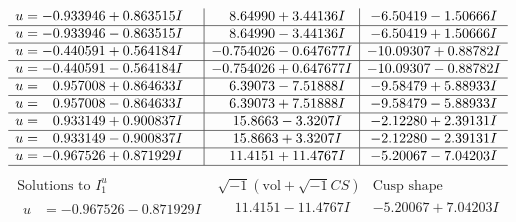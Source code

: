 \documentclass[1p]{elsarticle_modified}
\theoremstyle{definition}
\newcommand{\I}{\sqrt{-1}}
\begin{document}
$$\begin{array}{c|c|c}
\begin{aligned}
u &= -0.933946 + 0.863515 I\end{aligned}
 & \phantom{-}8.64990 + 3.44136 I & -6.50419 - 1.50666 I \\ \hline\begin{aligned}
u &= -0.933946 - 0.863515 I\end{aligned}
 & \phantom{-}8.64990 - 3.44136 I & -6.50419 + 1.50666 I \\ \hline\begin{aligned}
u &= -0.440591 + 0.564184 I\end{aligned}
 & -0.754026 - 0.647677 I & -10.09307 + 0.88782 I \\ \hline\begin{aligned}
u &= -0.440591 - 0.564184 I\end{aligned}
 & -0.754026 + 0.647677 I & -10.09307 - 0.88782 I \\ \hline\begin{aligned}
u &= \phantom{-}0.957008 + 0.864633 I\end{aligned}
 & \phantom{-}6.39073 - 7.51888 I & -9.58479 + 5.88933 I \\ \hline\begin{aligned}
u &= \phantom{-}0.957008 - 0.864633 I\end{aligned}
 & \phantom{-}6.39073 + 7.51888 I & -9.58479 - 5.88933 I \\ \hline\begin{aligned}
u &= \phantom{-}0.933149 + 0.900837 I\end{aligned}
 & \phantom{-}15.8663 - 3.3207 I & -2.12280 + 2.39131 I \\ \hline\begin{aligned}
u &= \phantom{-}0.933149 - 0.900837 I\end{aligned}
 & \phantom{-}15.8663 + 3.3207 I & -2.12280 - 2.39131 I \\ \hline\begin{aligned}
u &= -0.967526 + 0.871929 I\end{aligned}
 & \phantom{-}11.4151 + 11.4767 I & -5.20067 - 7.04203 I\\
 \hline 
 \end{array}$$\newpage$$\begin{array}{c|c|c}  
\text{Solutions to }I^u_{1}& \I (\text{vol} + \sqrt{-1}CS) & \text{Cusp shape}\\
 \hline 
\begin{aligned}
u &= -0.967526 - 0.871929 I\end{aligned}
 & \phantom{-}11.4151 - 11.4767 I & -5.20067 + 7.04203 I \\ \hline\begin{aligned}

\end{aligned}
\end{array}$$
\end{document}
